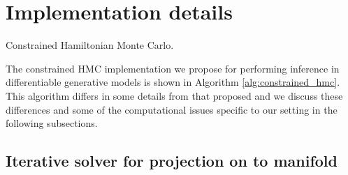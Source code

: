 
\section{Implementation details}

\begin{algorithm}[!t]
\caption{Constrained Hamiltonian Monte Carlo.}
\label{alg:constrained_hmc}
{
\small

}
\end{algorithm}

The constrained \ac{HMC} implementation we propose for performing inference in differentiable generative models is shown in Algorithm \ref{alg:constrained_hmc}. This algorithm differs in some details from that proposed \citep{brubaker2012family} and we discuss these differences and some of the computational issues specific to our setting in the following subsections.

\subsection{Iterative solver for projection on to manifold}

